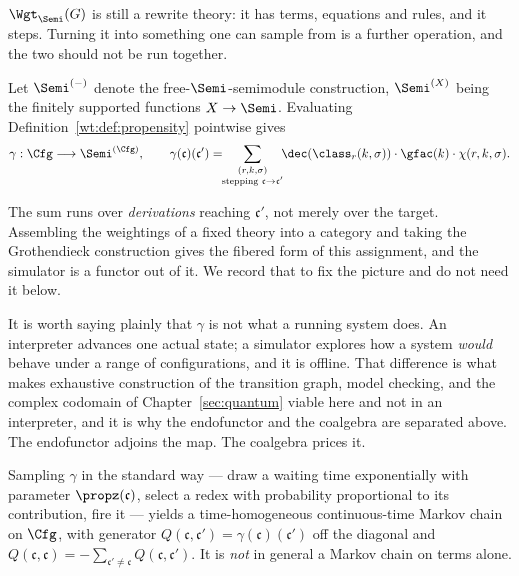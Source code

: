 $\Wgt_{\Semi}(G)$ is still a rewrite theory: it has terms, equations and rules, and it
steps. Turning it into something one can sample from is a further operation, and the two
should not be run together.

\begin{definition}
\label{wt:def:coalgebra}
Let $\Semi^{(-)}$ denote the free-$\Semi$-semimodule construction, $\Semi^{(X)}$ being the
finitely supported functions $X \to \Semi$. Evaluating
Definition~\ref{wt:def:propensity} pointwise gives
\[
  \gamma : \Cfg \longrightarrow \Semi^{(\Cfg)},
  \qquad
  \gamma(\mathfrak{c})(\mathfrak{c}')
  = \!\!\sum_{\substack{(r,k,\sigma) \\ \text{stepping } \mathfrak{c} \to \mathfrak{c}'}}\!\!
    \dec(\class_r(k,\sigma)) \cdot \gfac(k) \cdot \chi(r,k,\sigma).
\]
\end{definition}

The sum runs over \emph{derivations} reaching $\mathfrak{c}'$, not merely over the target.
Assembling the weightings of a fixed theory into a category and taking the Grothendieck
construction gives the fibered form of this assignment, and the simulator is a functor out
of it. We record that to fix the picture and do not need it below.

\begin{remark}
\label{wt:rmk:simulator}
It is worth saying plainly that $\gamma$ is not what a running system does.
An interpreter advances one actual state; a simulator explores how a system \emph{would}
behave under a range of configurations, and it is offline. That difference is what makes
exhaustive construction of the transition graph, model checking, and the complex codomain
of Chapter~\ref{sec:quantum} viable here and not in an interpreter, and it is why the
endofunctor and the coalgebra are separated above. The endofunctor adjoins the map. The
coalgebra prices it.
\end{remark}

\begin{theorem}
\label{wt:thm:markov}
Sampling $\gamma$ in the standard way --- draw a waiting time exponentially with parameter
$\propz(\mathfrak{c})$, select a redex with probability proportional to its contribution,
fire it --- yields a time-homogeneous continuous-time Markov chain on $\Cfg$, with
generator $Q(\mathfrak{c},\mathfrak{c}') = \gamma(\mathfrak{c})(\mathfrak{c}')$ off the
diagonal and $Q(\mathfrak{c},\mathfrak{c}) = -\sum_{\mathfrak{c}' \neq \mathfrak{c}}
Q(\mathfrak{c},\mathfrak{c}')$. It is \emph{not} in general a Markov chain on terms alone.
\end{theorem}

